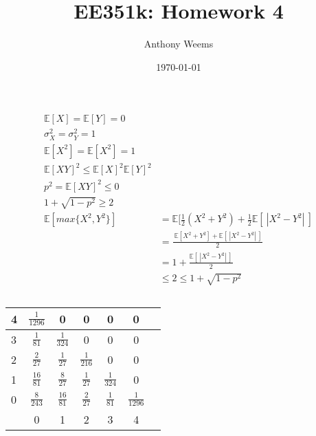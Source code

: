 \documentclass{article}
\begin{document}
\title{EE351k: Homework 4}
\author{Anthony Weems}
\date{\today}
\maketitle

\subsection{}

\begin{align*}
	\mathbb{E}[X] = \mathbb{E}[Y] = 0 \\
	\sigma_X^2 = \sigma_Y^2 = 1 \\
	\mathbb{E}[X^2] = \mathbb{E}[X^2] = 1 \\
	\mathbb{E}[XY]^2 \le \mathbb{E}[X]^2 \mathbb{E}[Y]^2 \\
	p^2 = \mathbb{E}[XY]^2 \le 0 \\
	1 + \sqrt{1 - p^2} \ge 2 \\
	\mathbb{E}[max\{X^2, Y^2\}] &= \mathbb{E}[\frac{1}{2}(X^2 + Y^2) + \frac{1}{2}\mathbb{E}[~|X^2 - Y^2|~] \\
	&= \frac{~\mathbb{E}[ X^2 + Y^2 ] + \mathbb{E}[~|X^2 - Y^2|~]}{2} \\
	&= 1 + \frac{\mathbb{E}[~|X^2 - Y^2|~]}{2} \\
	&\le 2 \le 1 + \sqrt{1 - p^2}
\end{align*}

\subsection{}

\begin{center}
	\begin{tabular}{l|*{5}{c|}r|}
	\hline
	4 & $\frac{1}{1296}$ &               0 &               0 &               0 &               0  \\ \hline
	3 &   $\frac{1}{81}$ & $\frac{1}{324}$ &               0 &               0 &               0  \\ \hline
	2 &   $\frac{2}{27}$ &  $\frac{1}{27}$ & $\frac{1}{216}$ &               0 &               0  \\ \hline
	1 &  $\frac{16}{81}$ &  $\frac{8}{27}$ &  $\frac{1}{27}$ & $\frac{1}{324}$ &               0  \\ \hline
	0 &  $\frac{8}{243}$ & $\frac{16}{81}$ &  $\frac{2}{27}$ &  $\frac{1}{81}$ & $\frac{1}{1296}$ \\ \hline
	  & 0 & 1 & 2 & 3 & 4  \\
	\end{tabular}
\end{center}
\end{document}
